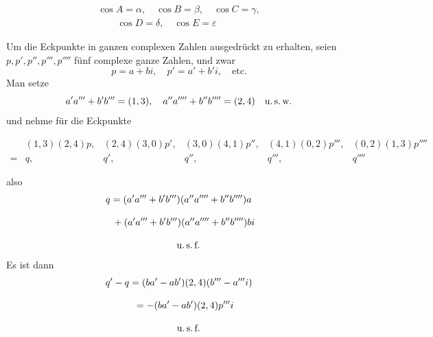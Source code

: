 \providecommand{\EqOverGt}{\mathrel{\substack{=\\>}}}

\begin{center}
\resizebox{.60\linewidth}{!}{}
\end{center}
\[
\begin{gathered}\cos A=\alpha,\quad \cos B=\beta,\quad \cos C=\gamma,\\[9pt]\quad{}\quad \cos D=\delta,\quad \cos E=\varepsilon\end{gathered}
\]

Um die Eckpunkte in ganzen complexen Zahlen ausgedrückt zu erhalten,
seien $p,p',p'',p''',p''''$ fünf complexe ganze Zahlen, und zwar
\[
p=a+bi,\quad p'=a'+b'i,\quad\text{etc.}
\]
Man setze
\[
a'a'''+b'b'''=(1,3),\quad a''a''''+b''b''''=(2,4)\quad\text{u.\,s.\,w.}
\]
und nehme für die Eckpunkte
\par\nopagebreak%
\begingroup\small\setlength{\arraycolsep}{2pt}\[
\begin{array}{rccccc} & (1,3)(2,4)p, & (2,4)(3,0)p', & (3,0)(4,1)p'', & (4,1)(0,2)p''', & (0,2)(1,3)p''''\\[9pt] = & q, & q', & q'', & q''', & q'''' \end{array}
\]\endgroup\par%

also
\[
\begin{gathered} q=(a'a'''+b'b''')(a''a''''+b''b'''')a \\[9pt]\quad{}+(a'a'''+b'b''')(a''a''''+b''b'''')bi\\[9pt] \qquad\text{u.\,s.\,f.} \end{gathered}
\]
Es ist dann
\[
\begin{gathered} q'-q=(ba'-ab')(2,4)(b'''-a'''i)\\[9pt]\quad{}=-(ba'-ab')(2,4)p'''i\\[9pt] \qquad\text{u.\,s.\,f.} \end{gathered}
\]




